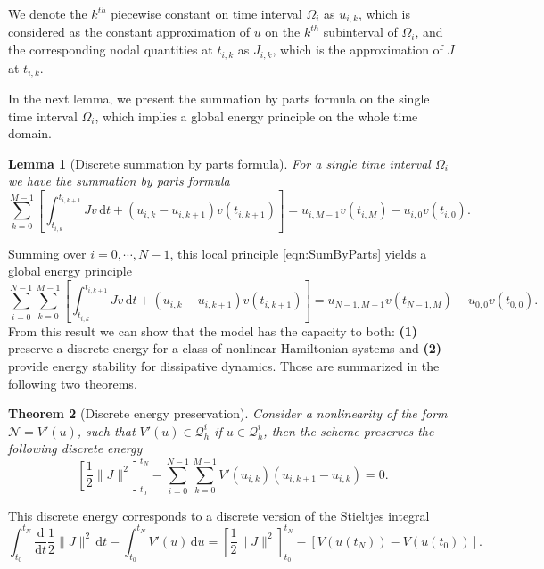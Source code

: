 \documentclass[12pt]{article}
\newtheorem{theorem}{Theorem}
\newtheorem{lemma}[theorem]{Lemma}
\begin{document}

We denote the $k^{th}$ piecewise constant on time interval $\Omega_i$ as $u_{i,k}$, which is considered as the constant approximation of $u$ on the $k^{th}$ subinterval of $\Omega_i$, and the corresponding nodal quantities at $t_{i,k}$ as  $J_{i,k}$, which is the approximation of $J$ at $t_{i,k}$.

In the next lemma, we present the summation by parts formula on the single time interval $\Omega_i$, which implies a global energy principle on the whole time domain.
\begin{lemma}[Discrete summation by parts formula]\label{thm:sbp}
For a single time interval $\Omega_i$ we have the summation by parts formula
\begin{equation} \label{eqn:SumByParts}
\sum_{k=0}^{M-1}
\left[
\int_{t_{i,k}}^{t_{i,k+1}} J v \, \mathrm{d}t
+ (u_{i,k} - u_{i,k+1})  v(t_{i,k+1})
\right]
= u_{i,M-1} v(t_{i,M}) - u_{i,0} v(t_{i,0}).
\end{equation}
\end{lemma}
Summing over $i=0, \cdots, N-1$, this local principle \eqref{eqn:SumByParts} yields a global energy principle
\begin{equation} \label{eqn:SumByPartsGlobal}
\sum_{i=0}^{N-1}\sum_{k=0}^{M-1}
\left[
\int_{t_{i,k}}^{t_{i,k+1}} J v \, \mathrm{d}t
+ (u_{i,k} - u_{i,k+1})  v(t_{i,k+1})
\right]
= u_{N-1,M-1} v(t_{N-1,M}) - u_{0,0} v(t_{0,0}).
\end{equation}
From this result we can show that the model has the capacity to both: \textbf{(1)} preserve a discrete energy for a class of nonlinear Hamiltonian systems and \textbf{(2)} provide energy stability for dissipative dynamics.  Those are summarized in the following two theorems. 
\begin{theorem}[Discrete energy preservation] \label{thm:energy_preservation}
Consider a nonlinearity of the form $\mathcal{N} = V'(u)$, such that  $V'(u) \in \mathcal{Q}_h^i$ if $u \in \mathcal{Q}_h^i$,  then the scheme preserves the following discrete energy
    \begin{equation} \label{eqn:nonlinear-discrete-energy-1}
    \left[ \frac12 \|J\|^2 \right]^{t_{N}}_{t_{0}} - \sum_{i=0}^{N-1} \sum_{k=0}^{M-1} V'(u_{i,k}) \left( u_{i,k+1} - u_{i,k}\right) = 0.
    \end{equation}
\end{theorem}
This discrete energy corresponds to a discrete version of the Stieltjes integral 
\begin{equation*}
    \int_{t_0}^{t_N}
    \frac{\mathrm{d}}{\mathrm{d}t} \frac12 \|J\|^2 \, \mathrm{d}t -  \int_{t_0}^{t_N} V'(u) \, \mathrm{d}u=
    \left[ \frac12 \|J\|^2 \right]^{t_{N}}_{t_{0}}  - \left[ V(u(t_N)) - V(u(t_0))\right] .
\end{equation*}
\end{document}
